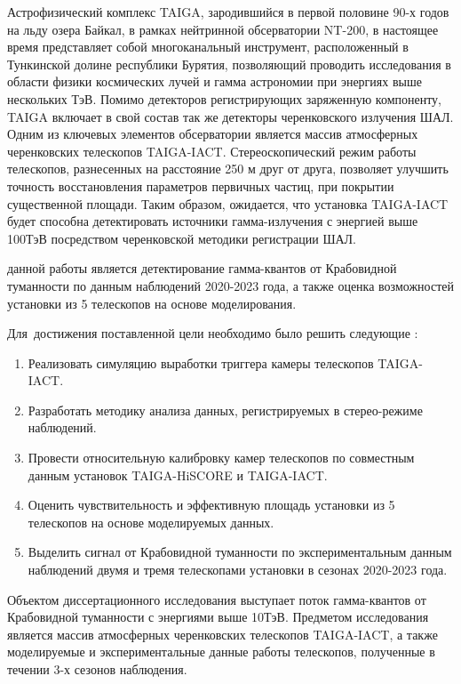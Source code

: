 Астрофизический комплекс TAIGA, зародившийся в первой половине 90-х годов на льду озера Байкал, в рамках нейтринной обсерватории NT-200\cite{NT200}, в настоящее время представляет собой многоканальный инструмент, расположенный в Тункинской долине республики Бурятия, позволяющий проводить исследования в области физики космических лучей и гамма астрономии при энергиях выше нескольких ТэВ. Помимо детекторов регистрирующих заряженную компоненту, TAIGA включает в свой состав так же детекторы черенковского излучения ШАЛ.
Одним из ключевых элементов обсерватории является массив атмосферных черенковских телескопов TAIGA-IACT. Стереоскопический режим работы телескопов, разнесенных на расстояние 250 м друг от друга, позволяет улучшить точность восстановления параметров первичных частиц, при покрытии существенной площади. Таким образом, ожидается, что установка TAIGA-IACT будет способна детектировать источники гамма-излучения с энергией выше 100ТэВ посредством черенковской методики регистрации ШАЛ.

{\aim} данной работы является детектирование гамма-квантов от Крабовидной туманности по данным наблюдений 2020-2023 года, а также оценка возможностей установки из 5 телескопов на основе моделирования. 

Для~достижения поставленной цели необходимо было решить следующие {\tasks}:
\begin{enumerate}[beginpenalty=10000] %
	\item Реализовать симуляцию выработки триггера камеры телескопов TAIGA-IACT.
	\item Разработать методику анализа данных, регистрируемых в стерео-режиме наблюдений.
	\item Провести относительную калибровку камер телескопов по совместным данным установок TAIGA-HiSCORE и TAIGA-IACT.
	\item Оценить чувствительность и эффективную площадь установки из 5 телескопов на основе моделируемых данных.
	\item Выделить сигнал от Крабовидной туманности по экспериментальным данным наблюдений двумя и тремя телескопами установки в сезонах 2020-2023 года.
\end{enumerate}

{\object} Объектом диссертационного исследования выступает поток гамма-квантов от Крабовидной туманности с энергиями выше 10ТэВ. Предметом исследования является массив атмосферных черенковских телескопов TAIGA-IACT, а также моделируемые и экспериментальные данные работы телескопов, полученные в течении 3-х сезонов наблюдения.

